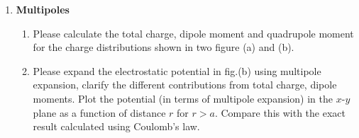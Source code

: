 \documentclass[a4paper,9pt]{article}
\begin{document}
\begin{enumerate}
  \item \textbf{Multipoles}
  \begin{enumerate}
    \item Please calculate the total charge, dipole moment and quadrupole moment for the charge distributions shown in two figure (a) and (b).
    \item Please expand the electrostatic potential in fig.(b) using multipole expansion, clarify the different contributions from total charge, dipole moments. Plot the potential (in terms of multipole expansion) in the $x$-$y$ plane as a function of distance $r$ for $r>a$. Compare this with the exact result calculated using Coulomb's law.
    \begin{figure}[h]
      \begin{minipage}[t]{0.45\linewidth}
        \centering
      \end{minipage}
      \hfill
      \begin{minipage}[t]{0.45\linewidth}
        \centering
      \end{minipage}
      

\end{figure}
\end{enumerate}
\end{enumerate}
\end{document}
